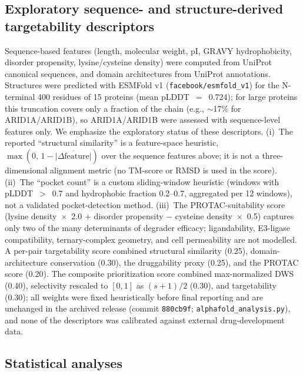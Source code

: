 \documentclass[11pt,a4paper]{article}
\begin{document}
\subsection*{Exploratory sequence- and structure-derived targetability descriptors}

Sequence-based features (length, molecular weight, pI, GRAVY hydrophobicity, disorder propensity, lysine/cysteine density) were computed from UniProt canonical sequences, and domain architectures from UniProt annotations. Structures were predicted with ESMFold v1 (\texttt{facebook/esmfold\_v1}) for the N-terminal 400 residues of 15 proteins (mean pLDDT~$=$~0.724); for large proteins this truncation covers only a fraction of the chain (e.g., $\sim$17\% for ARID1A/ARID1B), so ARID1A/ARID1B were assessed with sequence-level features only. We emphasize the exploratory status of these descriptors. (i)~The reported ``structural similarity'' is a feature-space heuristic, $\max(0,\,1 - \overline{|\Delta\text{feature}|})$ over the sequence features above; it is not a three-dimensional alignment metric (no TM-score or RMSD is used in the score). (ii)~The ``pocket count'' is a custom sliding-window heuristic (windows with pLDDT~$>$~0.7 and hydrophobic fraction 0.2--0.7, aggregated per 12 windows), not a validated pocket-detection method. (iii)~The PROTAC-suitability score (lysine density~$\times$~2.0 $+$ disorder propensity $-$ cysteine density~$\times$~0.5) captures only two of the many determinants of degrader efficacy; ligandability, E3-ligase compatibility, ternary-complex geometry, and cell permeability are not modelled. A per-pair targetability score combined structural similarity (0.25), domain-architecture conservation (0.30), the druggability proxy (0.25), and the PROTAC score (0.20). The composite prioritization score combined max-normalized DWS (0.40), selectivity rescaled to $[0,1]$ as $(s+1)/2$ (0.30), and targetability (0.30); all weights were fixed heuristically before final reporting and are unchanged in the archived release (commit \texttt{880cb9f}; \texttt{alphafold\_analysis.py}), and none of the descriptors was calibrated against external drug-development data.

\subsection*{Statistical analyses}
\end{document}
